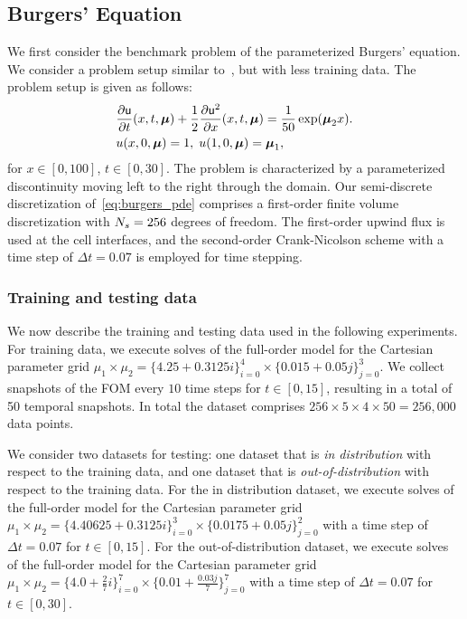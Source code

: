 \documentclass[3p,computermodern,10pt]{elsarticle}
\begin{document}
\subsection{Burgers' Equation}
We first consider the benchmark problem of the parameterized Burgers' equation. We consider a problem setup similar to~\cite{LEE2020108973}, but with less training data. The problem setup is given as follows: 
\begin{align}\label{eq:burgers_pde}
&\frac{\partial \mathsf{u}}{\partial t}(x,t,\boldsymbol \mu) + \frac{1}{2} \frac{\partial \mathsf{u}^2}{\partial x}(x,t,\boldsymbol \mu) = \frac{1}{50} \exp(\boldsymbol \mu_2 x). \\
&u(x,0,\boldsymbol \mu) = 1, \; u(1,0,\boldsymbol \mu) = \boldsymbol \mu_1,
\end{align}
for $x \in [0,100]$, $t \in [0,30]$. %
The problem is characterized by a parameterized discontinuity moving left to the right through the domain. Our semi-discrete discretization of~\eqref{eq:burgers_pde} comprises a first-order finite volume discretization with $N_s=256$ degrees of freedom. The first-order upwind flux is used at the cell interfaces, and the second-order Crank-Nicolson scheme with a time step of $\Delta t = 0.07$ is employed for time stepping.

\subsubsection{Training and testing data}
We now describe the training and testing data used in the following experiments. For training data, we execute solves of the full-order model for the Cartesian parameter grid $\mu_1 \times \mu_2 = \{ 4.25 + 0.3125 i \}_{i=0}^4 \times \{ 0.015 + 0.05 j \}_{j=0}^3$. We collect snapshots of the FOM every $10$ time steps for $t \in [0,15]$, resulting in a total of 50 temporal snapshots. In total the dataset comprises $256 \times 5 \times 4 \times 50 = 256,000$ data points.

We consider two datasets for testing: one dataset that is \textit{in distribution } with respect to the training data, and one dataset that is \textit{out-of-distribution} with respect to the training data. For the in distribution dataset, we execute solves of the full-order model for the Cartesian parameter grid $\mu_1 \times \mu_2 = \{4.40625 + 0.3125 i \}_{i=0}^3 \times \{ 0.0175 + 0.05 j \}_{j=0}^2$ with a time step of $\Delta t = 0.07$ for $t \in [0,15]$. For the out-of-distribution dataset, we execute solves of the full-order model for the Cartesian parameter grid $\mu_1 \times \mu_2 = \{4.0 + \frac{2}{7} i \}_{i=0}^7 \times \{ 0.01 + \frac{0.03 j}{7} \}_{j=0}^7$ with a time step of $\Delta t = 0.07$ for $t \in [0,30]$. 
\end{document}
